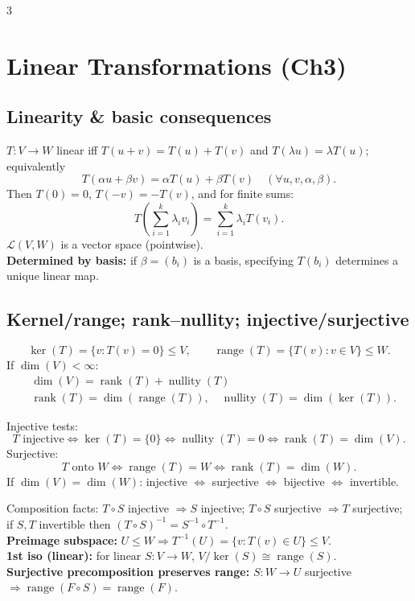 \documentclass[10pt]{article}
\newcommand{\rank}{\operatorname{rank}}
\newcommand{\nullity}{\operatorname{nullity}}
\newcommand{\Ker}{\operatorname{ker}}
\newcommand{\Range}{\operatorname{range}}
\begin{document}
\begin{multicols}{3}
\section*{Linear Transformations (Ch3)}

\subsection*{Linearity \& basic consequences}
$T:V\to W$ linear iff $T(u+v)=T(u)+T(v)$ and $T(\lambda u)=\lambda T(u)$; equivalently
\[
T(\alpha u+\beta v)=\alpha T(u)+\beta T(v)\quad(\forall u,v,\alpha,\beta).
\]
Then $T(0)=0$, $T(-v)=-T(v)$, and for finite sums:
\[
T\!\left(\sum_{i=1}^k\lambda_i v_i\right)=\sum_{i=1}^k\lambda_iT(v_i).
\]
$\mathcal{L}(V,W)$ is a vector space (pointwise).\\
\textbf{Determined by basis:} if $\beta=(b_i)$ is a basis, specifying $T(b_i)$ determines a unique linear map.

\subsection*{Kernel/range; rank--nullity; injective/surjective}
\[
\Ker(T)=\{v:T(v)=0\}\le V,\qquad \Range(T)=\{T(v):v\in V\}\le W.
\]
If $\dim(V)<\infty$:
\begin{align*}
& \dim(V)=\rank(T)+\nullity(T) \\
&\rank(T)=\dim(\Range(T)),\quad \nullity(T)=\dim(\Ker(T)).  
\end{align*}

Injective tests:
\[
T\text{ injective}\iff \Ker(T)=\{0\}\iff \nullity(T)=0\iff \rank(T)=\dim(V).
\]
Surjective:
\[
T\text{ onto }W\iff \Range(T)=W\iff \rank(T)=\dim(W).
\]
If $\dim(V)=\dim(W)$: injective $\iff$ surjective $\iff$ bijective $\iff$ invertible.

Composition facts: $T\circ S$ injective $\Rightarrow S$ injective; $T\circ S$ surjective $\Rightarrow T$ surjective; if $S,T$ invertible then $(T\circ S)^{-1}=S^{-1}\circ T^{-1}$.\\
\textbf{Preimage subspace:} $U\le W\Rightarrow T^{-1}(U)=\{v:T(v)\in U\}\le V$.\\
\textbf{1st iso (linear):} for linear $S:V\to W$, $V/\Ker(S)\cong \Range(S)$.\\
\textbf{Surjective precomposition preserves range:} $S:W\to U$ surjective $\Rightarrow \Range(F\circ S)=\Range(F)$.


\end{multicols}
\end{document}
